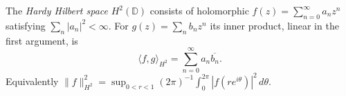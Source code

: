 
The \emph{Hardy Hilbert space} $H^2(\mathbb D)$ consists of holomorphic $f(z)=\sum_{n=0}^\infty a_nz^n$ satisfying $\sum_n|a_n|^2<\infty$. For $g(z)=\sum_nb_nz^n$ its inner product, linear in the first argument, is
\[
\langle f,g\rangle_{H^2}=\sum_{n=0}^\infty a_n\overline{b_n}.
\]
Equivalently $\|f\|_{H^2}^2=\sup_{0<r<1}(2\pi)^{-1}\int_0^{2\pi}|f(re^{i\theta})|^2\,d\theta$.
